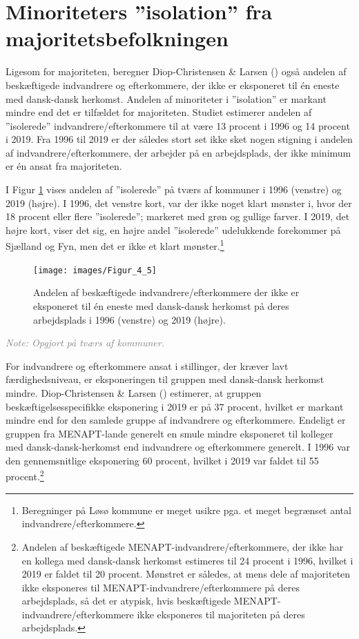 \documentclass[
]{book}
\begin{document}
\section{Minoriteters ''isolation'' fra majoritetsbefolkningen}\label{minoriteters-isolation-fra-majoritetsbefolkningen}

Ligesom for majoriteten, beregner Diop-Christensen \& Larsen () også andelen af beskæftigede indvandrere og efterkommere, der ikke er eksponeret til én eneste med dansk-dansk herkomst. Andelen af minoriteter i ''isolation'' er markant mindre end det er tilfældet for majoriteten. Studiet estimerer andelen af ''isolerede'' indvandrere/efterkommere til at være 13 procent i 1996 og 14 procent i 2019. Fra 1996 til 2019 er der således stort set ikke sket nogen stigning i andelen af indvandrere/efterkommere, der arbejder på en arbejdsplads, der ikke minimum er én ansat fra majoriteten.

I Figur \ref{fig:fig-5-6} vises andelen af ''isolerede'' på tværs af kommuner i 1996 (venstre) og 2019 (højre). I 1996, det venstre kort, var der ikke noget klart mønster i, hvor der 18 procent eller flere ''isolerede''; markeret med grøn og gullige farver. I 2019, det højre kort, viser det sig, en højre andel ''isolerede'' udelukkende forekommer på Sjælland og Fyn, men det er ikke et klart mønster.\footnote{Beregninger på Løsø kommune er meget usikre pga. et meget begrænset antal indvandrere/efterkommere.}

\begin{figure}
\texttt{[image: images/Figur\_4\_5]} \caption{Andelen af beskæftigede indvandrere/efterkommere der ikke er eksponeret til én eneste med dansk-dansk herkomst på deres arbejdsplads i 1996 (venstre) og 2019 (højre).}\label{fig:fig-5-6}
\end{figure}

\begin{footnotesize}\textit{\textcolor{gray}{
Note: Opgjort på tværs af kommuner.
}}
\end{footnotesize}

For indvandrere og efterkommere ansat i stillinger, der kræver lavt færdighedsniveau, er eksponeringen til gruppen med dansk-dansk herkomst mindre. Diop-Christensen \& Larsen () estimerer, at gruppen beskæftigelsesspecifikke eksponering i 2019 er på 37 procent, hvilket er markant mindre end for den samlede gruppe af indvandrere og efterkommere. Endeligt er gruppen fra MENAPT-lande generelt en smule mindre eksponeret til kolleger med dansk-dansk-herkomst end indvandrere og efterkommere generelt. I 1996 var den gennemsnitlige eksponering 60 procent, hvilket i 2019 var faldet til 55 procent.\footnote{Andelen af beskæftigede MENAPT-indvandrere/efterkommere, der ikke har en kollega med dansk-dansk herkomst estimeres til 24 procent i 1996, hvilket i 2019 er faldet til 20 procent. Mønstret er således, at mens dele af majoriteten ikke eksponeres til MENAPT-indvandrere/efterkommere på deres arbejdsplads, så det er atypisk, hvis beskæftigede MENAPT-indvandrere/efterkommere ikke eksponeres til majoriteten på deres arbejdsplads.}
\end{document}
